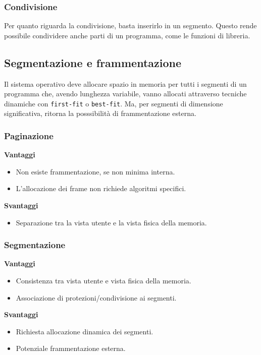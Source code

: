 \documentclass[a4paper,12pt, twoside]{report}
\newcommand{\defbox}[1]{\noindent\colorbox{shadecolor}
{\parbox{\dimexpr\textwidth-2\fboxsep\relax}{#1}}}
\begin{document}
\subsubsection{Condivisione}
Per quanto riguarda la condivisione, basta inserirlo in un segmento. Questo rende possibile condividere 
anche parti di un programma, come le funzioni di libreria. 

\subsection{Segmentazione e frammentazione}
Il sistema operativo deve allocare spazio in memoria per tutti i segmenti di un programma che, avendo 
lunghezza variabile, vanno allocati attraverso tecniche dinamiche con \texttt{first-fit} o \texttt{best-fit}. Ma, per segmenti di dimensione significativa, ritorna la posssibilit\`a di frammentazione esterna.

\subsubsection{Paginazione}
\begin{center}
\defbox{\textbf{Vantaggi}
\begin{itemize}
    \item Non esiste frammentazione, se non minima interna.
    \item L'allocazione dei frame non richiede algoritmi specifici.
\end{itemize} 
\textbf{Svantaggi}
\begin{itemize}
    \item Separazione tra la vista utente e la vista fisica della memoria.
\end{itemize}
}
\end{center}
\subsubsection{Segmentazione}
\begin{center}
\defbox{\textbf{Vantaggi}
\begin{itemize}
    \item Consistenza tra vista utente e vista fisica della memoria. 
    \item Associazione di protezioni/condivisione ai segmenti.
\end{itemize}
\textbf{Svantaggi}
\begin{itemize}
    \item Richiesta allocazione dinamica dei segmenti. 
    \item Potenziale frammentazione esterna.
\end{itemize}
}
\end{center}
\end{document}
